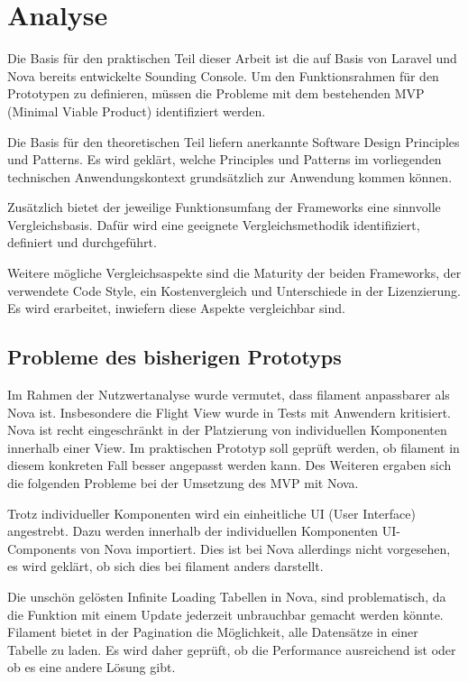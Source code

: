 \section{Analyse}
Die Basis für den praktischen Teil dieser Arbeit ist die auf Basis von Laravel und Nova bereits entwickelte Sounding Console.
Um den Funktionsrahmen für den Prototypen zu definieren, müssen die Probleme mit dem bestehenden MVP (Minimal Viable Product) identifiziert werden.

Die Basis für den theoretischen Teil liefern anerkannte Software Design Principles und Patterns.
Es wird geklärt, welche Principles und Patterns im vorliegenden technischen Anwendungskontext grundsätzlich zur Anwendung kommen können.

Zusätzlich bietet der jeweilige Funktionsumfang der Frameworks eine sinnvolle Vergleichsbasis.
Dafür wird eine geeignete Vergleichsmethodik identifiziert, definiert und durchgeführt.

Weitere mögliche Vergleichsaspekte sind die Maturity der beiden Frameworks, der verwendete Code Style, ein Kostenvergleich und Unterschiede in der Lizenzierung.
Es wird erarbeitet, inwiefern diese Aspekte vergleichbar sind.

\subsection{Probleme des bisherigen Prototyps}
Im Rahmen der Nutzwertanalyse wurde vermutet, dass filament anpassbarer als Nova ist.
Insbesondere die Flight View wurde in Tests mit Anwendern kritisiert.
Nova ist recht eingeschränkt in der Platzierung von individuellen Komponenten innerhalb einer View.
Im praktischen Prototyp soll geprüft werden, ob filament in diesem konkreten Fall besser angepasst werden kann.
Des Weiteren ergaben sich die folgenden Probleme bei der Umsetzung des MVP mit Nova.

Trotz individueller Komponenten wird ein einheitliche UI (User Interface) angestrebt.
Dazu werden innerhalb der individuellen Komponenten UI-Components von Nova importiert.
Dies ist bei Nova allerdings nicht vorgesehen, es wird geklärt, ob sich dies bei filament anders darstellt.

Die unschön gelösten Infinite Loading Tabellen in Nova, sind problematisch, da die Funktion mit einem Update jederzeit unbrauchbar gemacht werden könnte.
Filament bietet in der Pagination die Möglichkeit, alle Datensätze in einer Tabelle zu laden.
Es wird daher geprüft, ob die Performance ausreichend ist oder ob es eine andere Lösung gibt.


